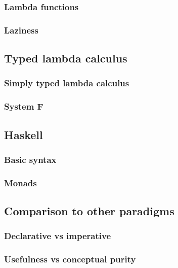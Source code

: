 \documentclass[11pt]{article}
\begin{document}
\subsubsection{Lambda functions}

\subsubsection{Laziness}\label{laziness}

\subsection{Typed lambda calculus}

\subsubsection{Simply typed lambda calculus}

\subsubsection{System F}

\subsection{Haskell}\label{haskell}

\subsubsection{Basic syntax}

\subsubsection{Monads}

\subsection{Comparison to other paradigms}\label{comparison}

\subsubsection{Declarative vs imperative}

\subsubsection{Usefulness vs conceptual purity}
\end{document}
